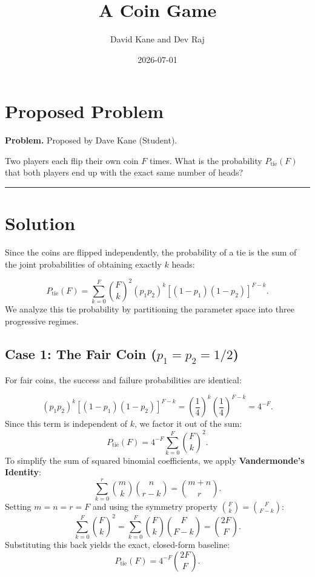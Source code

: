 \documentclass[
  letterpaper,
  DIV=11,
  numbers=noendperiod]{scrartcl}
\title{A Coin Game}
\author{David Kane and Dev Raj}
\date{2026-07-01}
\renewcommand*\contentsname{Table of contents}
\newcommand\contentsname{Table of contents}
\begin{document}
\maketitle

\renewcommand*\contentsname{Table of contents}
{
\setcounter{tocdepth}{3}
\tableofcontents
}

\section{Proposed Problem}\label{proposed-problem}

\textbf{Problem.} Proposed by Dave Kane (Student).

Two players each flip their own coin \(F\) times. What is the
probability \(P_{\text{tie}}(F)\) that both players end up with the
exact same number of heads?

\begin{center}\rule{0.5\linewidth}{0.5pt}\end{center}

\section{Solution}\label{solution}

Since the coins are flipped independently, the probability of a tie is
the sum of the joint probabilities of obtaining exactly \(k\) heads:

\[
P_{\text{tie}}(F) = \sum_{k=0}^{F} \binom{F}{k}^2 (p_1 p_2)^k \left[ (1-p_1)(1-p_2) \right]^{F-k}.
\] We analyze this tie probability by partitioning the parameter space
into three progressive regimes.

\subsection{\texorpdfstring{Case 1: The Fair Coin
(\(p_1 = p_2 = 1/2\))}{Case 1: The Fair Coin (p\_1 = p\_2 = 1/2)}}\label{case-1-the-fair-coin-p_1-p_2-12}

For fair coins, the success and failure probabilities are identical:

\[
(p_1 p_2)^k \left[ (1-p_1)(1-p_2) \right]^{F-k} = \left(\frac{1}{4}\right)^k \left(\frac{1}{4}\right)^{F-k} = 4^{-F}.
\] Since this term is independent of \(k\), we factor it out of the sum:
\[
P_{\text{tie}}(F) = 4^{-F} \sum_{k=0}^{F} \binom{F}{k}^2.
\] To simplify the sum of squared binomial coefficients, we apply
\textbf{Vandermonde's Identity}: \[
\sum_{k=0}^{r} \binom{m}{k}\binom{n}{r-k} = \binom{m+n}{r}.
\] Setting \(m = n = r = F\) and using the symmetry property
\(\binom{F}{k} = \binom{F}{F-k}\): \[
\sum_{k=0}^{F} \binom{F}{k}^2 = \sum_{k=0}^{F} \binom{F}{k}\binom{F}{F-k} = \binom{2F}{F}.
\] Substituting this back yields the exact, closed-form baseline: \[
P_{\text{tie}}(F) = 4^{-F}\binom{2F}{F}.
\]
\end{document}
